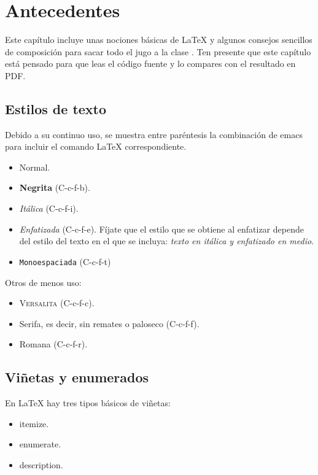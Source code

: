 \chapter{Antecedentes}

Este capítulo incluye unas nociones básicas de \LaTeX{} y algunos consejos
sencillos de composición para sacar todo el jugo a la clase \arcopfc. Ten
presente que este capítulo está pensado para que leas el código fuente y lo
compares con el resultado en PDF.

\section{Estilos de texto}

Debido a su continuo uso, se muestra entre paréntesis la combinación de emacs
para incluir el comando \LaTeX{} correspondiente.

\begin{itemize}[noitemsep]
\item Normal.
\item \textbf{Negrita} (C-c-f-b).
\item \textit{Itálica} (C-c-f-i).
\item \emph{Enfatizada} (C-c-f-e). Fíjate que el estilo que se obtiene al
  enfatizar depende del estilo del texto en el que se incluya: \textit{texto en
    itálica y \emph{enfatizado} en medio}.
\item \texttt{Monoespaciada} (C-c-f-t)
\end{itemize}

Otros de menos uso:

\begin{itemize}[noitemsep]
\item \textsc{Versalita} (C-c-f-c).
\item \textsf{Serifa}, es decir, sin remates o paloseco (C-c-f-f).
\item \textrm{Romana} (C-c-f-r).
\end{itemize}


\section{Viñetas y enumerados}

En \LaTeX{} hay tres tipos básicos de viñetas:

\begin{itemize}
\item itemize.
\item enumerate.
\item description.
\end{itemize}


